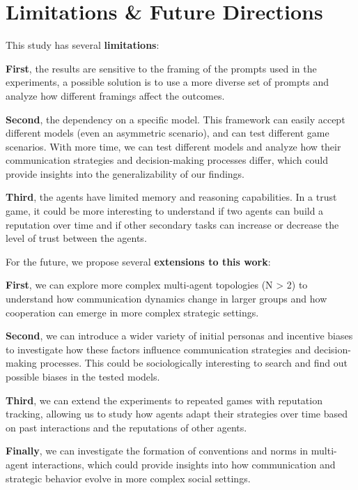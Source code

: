 \section{Limitations \& Future Directions}

This study has several \textbf{limitations}:
\begin{list}{\hspace{0.5cm}\textbullet}{\leftmargin=0.5cm}
      \item \textbf{First}, the results are sensitive to the framing of the prompts used in the experiments, a possible solution is to use a more diverse set of prompts and analyze how different framings affect the outcomes.
      \item \textbf{Second}, the dependency on a specific model. This framework can easily accept different models (even an asymmetric scenario), and can test different game scenarios.
            With more time, we can test different models and analyze how their communication strategies and decision-making processes differ, which could provide insights into the generalizability of our findings.
      \item \textbf{Third}, the agents have limited memory and reasoning capabilities. In a trust game, it could be more interesting to understand if two agents can build a reputation over time and if other secondary tasks can increase or decrease the level of trust between the agents.
\end{list}

For the future, we propose several \textbf{extensions to this work}:
\begin{list}{\hspace{0.5cm}\textbullet}{\leftmargin=0.5cm}
      \item \textbf{First}, we can explore more complex multi-agent topologies (N > 2) to understand how communication dynamics change in larger groups and how cooperation can emerge in more complex strategic settings.
      \item \textbf{Second}, we can introduce a wider variety of initial personas and incentive biases to investigate how these factors influence communication strategies and decision-making processes.
            This could be sociologically interesting to search and find out possible biases in the tested models.
      \item \textbf{Third}, we can extend the experiments to repeated games with reputation tracking, allowing us to study how agents adapt their strategies over time based on past interactions and the reputations of other agents.
      \item \textbf{Finally}, we can investigate the formation of conventions and norms in multi-agent interactions,
            which could provide insights into how communication and strategic behavior evolve in more complex social settings.
\end{list}
